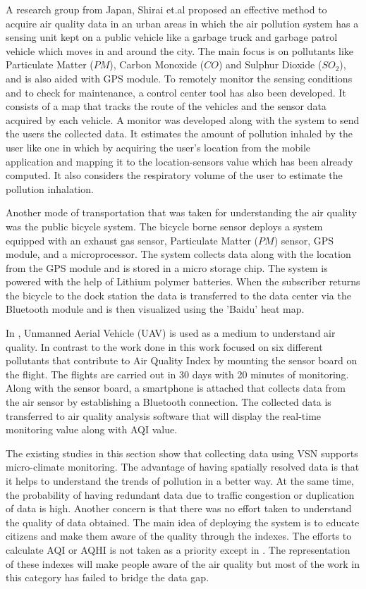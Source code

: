 A research group from Japan, Shirai et.al \cite{Shirai2016} proposed an effective method to acquire air quality data in an urban areas in which the air pollution system has a sensing unit kept on a public vehicle like a garbage truck and garbage patrol vehicle which moves in and around the city. The main focus is on pollutants like Particulate Matter ($PM$), Carbon Monoxide ($CO$) and Sulphur Dioxide ($SO_2$), and is also aided with GPS module. To remotely monitor the sensing conditions and to check for maintenance, a control center tool has also been developed. It consists of a map that tracks the route of the vehicles and the sensor data acquired by each vehicle. A monitor was developed along with the system to send the users the collected data. It estimates the amount of pollution inhaled by the user like one in \cite{Devarakonda2013} which by acquiring the user's location from the mobile application and mapping it to the location-sensors value which has been already computed. It also considers the respiratory volume of the user to estimate the pollution inhalation.

Another mode of transportation that was taken for understanding the air quality was the public bicycle system. The bicycle borne sensor \cite{Xiang2016,Liu2015a} deploys a system equipped with an exhaust gas sensor, Particulate Matter ($PM$) sensor, GPS module, and a microprocessor. The system collects data along with the location from the GPS module and is stored in a micro storage chip. The system is powered with the help of Lithium polymer batteries. When the subscriber returns the bicycle to the dock station the data is transferred to the data center via the Bluetooth module and is then visualized using the 'Baidu' heat map.

In \cite{Zhi2017}, Unmanned Aerial Vehicle (UAV) is used as a medium to understand air quality.  In contrast to the work done in \cite{Hu2009,Hu2011,Volgyesi2008,Devarakonda2013,Shirai2016,Xiang2016,Liu2015a,Saha2017} this work focused on six different pollutants that contribute to Air Quality Index by mounting the sensor board on the flight. The flights are carried out in 30 days with 20 minutes of monitoring. Along with the sensor board, a smartphone is attached that collects data from the air sensor by establishing a Bluetooth connection. The collected data is transferred to air quality analysis software that will display the real-time monitoring value along with AQI value. 

The existing studies in this section show that collecting data using VSN supports micro-climate monitoring. The advantage of having spatially resolved data is that it helps to understand the trends of pollution in a better way. At the same time, the probability of having redundant data due to traffic congestion or duplication of data is high. Another concern is that there was no effort taken to understand the quality of data obtained. The main idea of deploying the system is to educate citizens and make them aware of the quality through the indexes. 
The efforts to calculate AQI or AQHI is not taken as a priority except in \cite{Zhi2017}. The representation of these indexes will make people aware of the air quality but most of the work in this category has failed to bridge the data gap.


